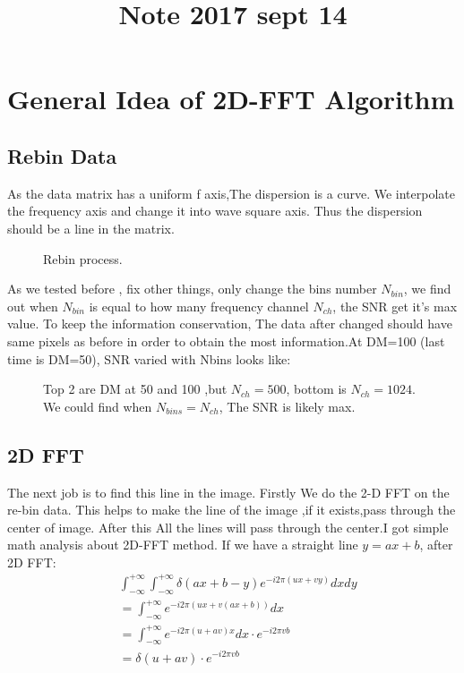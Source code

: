 \documentclass{aastex61}
\begin{document}
\title{Note 2017 sept 14}
\section{General Idea of 2D-FFT Algorithm}
\subsection{Rebin Data}

As the data matrix has a uniform f axis,The dispersion is a curve. We interpolate the frequency
axis and change it into wave square axis. Thus the dispersion should be a line in the matrix. 
\begin{figure}[ht!]
\caption{Rebin process.\label{fig:rebin}}
\end{figure}


As we tested before , fix other things, only change the bins number $N_{bin}$, we find out when $N_{bin}$ is equal to how many frequency channel $N_{ch}$, the SNR get it's max value.
To keep the information conservation, The data after changed should have same pixels as before in order to obtain the most information.At DM=100 (last time is DM=50), SNR varied with Nbins looks like:
\begin{figure}[ht!]
\caption{Top 2 are DM at 50 and 100 ,but $N_{ch}=500$, bottom is $N_{ch}=1024$. We could find when $N_{bins}=N_{ch}$, The SNR is likely max. \label{fig:nbin}}
\end{figure}

\subsection{2D FFT}
The next job is to find this line in the image. Firstly We do the 2-D FFT on the re-bin data. This helps to make the line of the image ,if it exists,pass through the center of image. After this All the lines will pass through the center.I got simple math analysis about 2D-FFT method. If we have a straight line $y=ax +b$, after 2D FFT:
\begin{equation} \begin{aligned}
&\int_{-\infty}^{+\infty}\int_{-\infty}^{+\infty}\delta(ax+b-y)e^{-i2\pi(ux+vy)}dxdy
\\ &= \int_{-\infty}^{+\infty}e^{-i2\pi(ux+v(ax+b))}dx
\\ &= \int_{-\infty}^{+\infty}e^{-i2\pi(u+av)x}dx \cdot e^{-i2\pi vb}
\\ &=\delta(u+av)\cdot e^{-i2\pi vb}
\end{aligned}
\end{equation}
\end{document}
